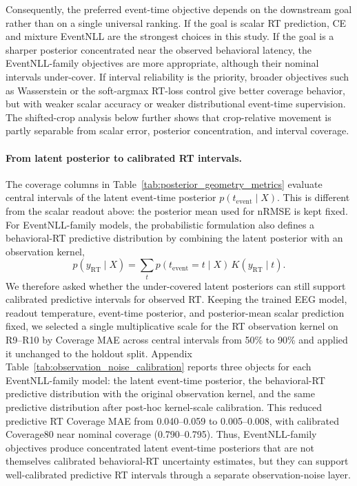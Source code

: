 \documentclass[12pt]{article}
\begin{document}
Consequently, the preferred event-time objective depends on the downstream goal rather than on a single universal ranking. If the goal is scalar RT prediction, CE and mixture EventNLL are the strongest choices in this study. If the goal is a sharper posterior concentrated near the observed behavioral latency, the EventNLL-family objectives are more appropriate, although their nominal intervals under-cover. If interval reliability is the priority, broader objectives such as Wasserstein or the soft-argmax RT-loss control give better coverage behavior, but with weaker scalar accuracy or weaker distributional event-time supervision. The shifted-crop analysis below further shows that crop-relative movement is partly separable from scalar error, posterior concentration, and interval coverage.

\paragraph{From latent posterior to calibrated RT intervals.}
The coverage columns in Table~\ref{tab:posterior_geometry_metrics} evaluate central intervals of the latent event-time posterior \(p(t_{\mathrm{event}}\mid X)\). This is different from the scalar readout above: the posterior mean used for nRMSE is kept fixed. For EventNLL-family models, the probabilistic formulation also defines a behavioral-RT predictive distribution by combining the latent posterior with an observation kernel,
\[
p(y_{\mathrm{RT}}\mid X)=\sum_t p(t_{\mathrm{event}}=t\mid X)\,K(y_{\mathrm{RT}}\mid t).
\]
We therefore asked whether the under-covered latent posteriors can still support calibrated predictive intervals for observed RT. Keeping the trained EEG model, readout temperature, event-time posterior, and posterior-mean scalar prediction fixed, we selected a single multiplicative scale for the RT observation kernel on R9--R10 by Coverage MAE across central intervals from 50\% to 90\% and applied it unchanged to the holdout split. Appendix Table~\ref{tab:observation_noise_calibration} reports three objects for each EventNLL-family model: the latent event-time posterior, the behavioral-RT predictive distribution with the original observation kernel, and the same predictive distribution after post-hoc kernel-scale calibration. This reduced predictive RT Coverage MAE from 0.040--0.059 to 0.005--0.008, with calibrated Coverage80 near nominal coverage (0.790--0.795). Thus, EventNLL-family objectives produce concentrated latent event-time posteriors that are not themselves calibrated behavioral-RT uncertainty estimates, but they can support well-calibrated predictive RT intervals through a separate observation-noise layer.
\end{document}
